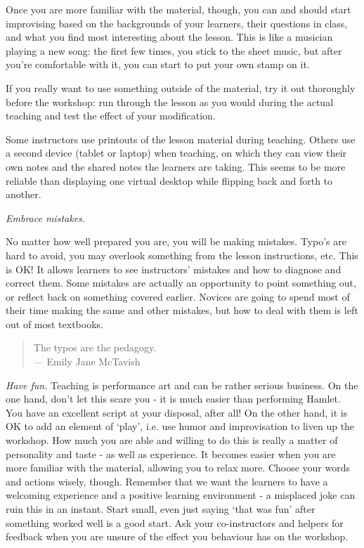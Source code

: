 \begin{genumerate}
  Once you are more familiar with the material, though, you can and
  should start improvising based on the backgrounds of your learners,
  their questions in class, and what you find most interesting about
  the lesson.  This is like a musician playing a new song: the first
  few times, you stick to the sheet music, but after you're
  comfortable with it, you can start to put your own stamp on it.

  If you really want to use something outside of the material, try it
  out thoroughly before the workshop: run through the lesson as you
  would during the actual teaching and test the effect of your
  modification.

  Some instructors use printouts of the lesson material during
  teaching.  Others use a second device (tablet or laptop) when
  teaching, on which they can view their own notes and the shared
  notes the learners are taking. This seems to be more reliable than
  displaying one virtual desktop while flipping back and forth to
  another.

\item
  \emph{Embrace mistakes.}

  No matter how well prepared you are, you will be making
  mistakes. Typo's are hard to avoid, you may overlook something from
  the lesson instructions, etc. This is OK! It allows learners to see
  instructors' mistakes and how to diagnose and correct them. Some
  mistakes are actually an opportunity to point something out, or
  reflect back on something covered earlier. Novices are going to
  spend most of their time making the same and other mistakes, but how
  to deal with them is left out of most textbooks.

  \begin{quote}
    The typos are the pedagogy.
    \\
    --- Emily Jane McTavish
  \end{quote}

\item
  \emph{Have fun.}  Teaching is performance art and can be rather
  serious business. On the one hand, don't let this scare you - it is
  much easier than performing Hamlet. You have an excellent script at
  your disposal, after all! On the other hand, it is OK to add an
  element of `play', i.e. use humor and improvisation to liven up the
  workshop. How much you are able and willing to do this is really a
  matter of personality and taste - as well as experience. It becomes
  easier when you are more familiar with the material, allowing you to
  relax more. Choose your words and actions wisely, though. Remember
  that we want the learners to have a welcoming experience and a
  positive learning environment - a misplaced joke can ruin this in an
  instant. Start small, even just saying `that was fun' after
  something worked well is a good start. Ask your co-instructors and
  helpers for feedback when you are unsure of the effect you behaviour
  has on the workshop.

\end{genumerate}

